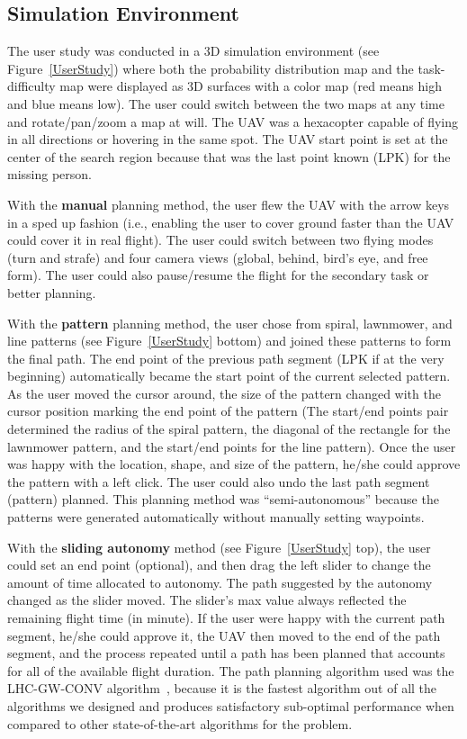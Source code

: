 \documentclass[lettersize, apacite, twoside, HRI]{apa_HRI}
\begin{document}
\subsection{Simulation Environment}

The user study was conducted in a 3D simulation environment (see Figure~\ref{UserStudy}) where both the probability distribution map and the task-difficulty map were displayed as 3D surfaces with a color map (red means high and blue means low). The user could switch between the two maps at any time and rotate/pan/zoom a map at will. The UAV was a hexacopter capable of flying in all directions or hovering in the same spot. The UAV start point is set at the center of the search region because that was the last point known (LPK) for the missing person.

With the \textbf{manual} planning method, the user flew the UAV with the arrow keys in a sped up fashion (i.e., enabling the user to cover ground faster than the UAV could cover it in real flight). The user could switch between two flying modes (turn and strafe) and four camera views (global, behind, bird's eye, and free form). The user could also pause/resume the flight for the secondary task or better planning.

With the \textbf{pattern} planning method, the user chose from spiral, lawnmower, and line patterns (see Figure~\ref{UserStudy} bottom) and joined these patterns to form the final path. The end point of the previous path segment (LPK if at the very beginning) automatically became the start point of the current selected pattern. As the user moved the cursor around, the size of the pattern changed with the cursor position marking the end point of the pattern (The start/end points pair determined the radius of the spiral pattern, the diagonal of the rectangle for the lawnmower pattern, and the start/end points for the line pattern). Once the user was happy with the location, shape, and size of the pattern, he/she could approve the pattern with a left click. The user could also undo the last path segment (pattern) planned. This planning method was ``semi-autonomous'' because the patterns were generated automatically without manually setting waypoints.

With the \textbf{sliding autonomy} method (see Figure~\ref{UserStudy} top), the user could set an end point (optional), and then drag the left slider to change the amount of time allocated to autonomy. The path suggested by the autonomy changed as the slider moved. The slider's max value always reflected the remaining flight time (in minute). If the user were happy with the current path segment, he/she could approve it, the UAV then moved to the end of the path segment, and the process repeated until a path has been planned that accounts for all of the available flight duration. The path planning algorithm used was the LHC-GW-CONV algorithm~\cite{Lin2009UAV, Lin2014Hierarchical}, because it is the fastest algorithm out of all the algorithms we designed and produces satisfactory sub-optimal performance when compared to other state-of-the-art algorithms for the problem.
\end{document}

